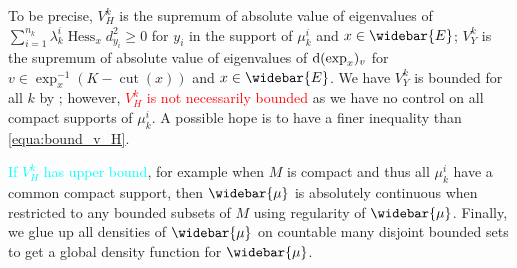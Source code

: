 To be precise, $V_H^k$ is the supremum of absolute value of eigenvalues of
$ \sum_{i=1}^{n_k} \lambda_k^i \operatorname{Hess}_x d^2_{y_i} \geq 0$
for $y_i$ in the support of $\mu_k^i$ and $x \in \widebar{E} $;
$V_Y^k$ is the supremum of absolute value of eigenvalues of $\operatorname{d} (\exp_x)_v $
for $v \in \exp_x^{-1}(K - \operatorname{cut}(x))$ and $x \in \widebar{E}$.
We have $V_Y^k$ is bounded for all $k$ by ;
however, \textcolor{red}{$V_H^k$ is not necessarily bounded} as we have no control
on all compact supports of $\mu_k^i$.
A possible hope is to have a finer inequality than \cref{equa:bound_v_H}. 

\textcolor{cyan}{If $V_H^k$ has upper bound},
for example when $M$ is compact and thus all $\mu_k^i$ have a common compact support,
then $\widebar{\mu}$ is absolutely continuous when restricted to any bounded subsets of $M$
using regularity of $\widebar{\mu}$.
Finally, we glue up all densities of $\widebar{\mu}$ on
countable many disjoint bounded sets to get a global density function for $\widebar{\mu}$.

